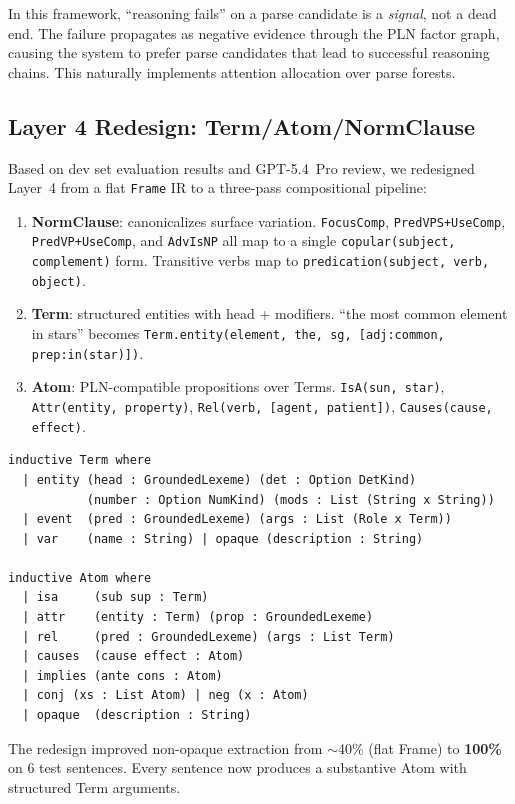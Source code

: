 \documentclass[]{article}
\newcommand{\code}[1]{\texttt{#1}}
\begin{document}
In this framework, ``reasoning fails'' on a parse candidate is
a \emph{signal}, not a dead end. The failure propagates as negative
evidence through the PLN factor graph, causing the system to
prefer parse candidates that lead to successful reasoning chains.
This naturally implements attention allocation over parse forests.

\subsection{Layer 4 Redesign: Term/Atom/NormClause}

Based on dev set evaluation results and GPT-5.4~Pro review, we
redesigned Layer~4 from a flat \code{Frame} IR to a three-pass
compositional pipeline:

\begin{enumerate}
\item \textbf{NormClause}: canonicalizes surface variation.
  \code{FocusComp}, \code{PredVPS+UseComp}, \code{PredVP+UseComp},
  and \code{AdvIsNP} all map to a single \code{copular(subject, complement)}
  form. Transitive verbs map to \code{predication(subject, verb, object)}.

\item \textbf{Term}: structured entities with head + modifiers.
  ``the most common element in stars'' becomes
  \code{Term.entity(element, the, sg, [adj:common, prep:in(star)])}.

\item \textbf{Atom}: PLN-compatible propositions over Terms.
  \code{IsA(sun, star)}, \code{Attr(entity, property)},
  \code{Rel(verb, [agent, patient])}, \code{Causes(cause, effect)}.
\end{enumerate}

\begin{lstlisting}[language={}]
inductive Term where
  | entity (head : GroundedLexeme) (det : Option DetKind)
           (number : Option NumKind) (mods : List (String x String))
  | event  (pred : GroundedLexeme) (args : List (Role x Term))
  | var    (name : String) | opaque (description : String)

inductive Atom where
  | isa     (sub sup : Term)
  | attr    (entity : Term) (prop : GroundedLexeme)
  | rel     (pred : GroundedLexeme) (args : List Term)
  | causes  (cause effect : Atom)
  | implies (ante cons : Atom)
  | conj (xs : List Atom) | neg (x : Atom)
  | opaque  (description : String)
\end{lstlisting}

The redesign improved non-opaque extraction from $\sim$40\% (flat Frame)
to \textbf{100\%} on 6 test sentences. Every sentence now produces a
substantive Atom with structured Term arguments.
\end{document}
